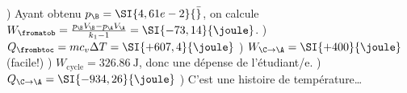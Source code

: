 \begin{description}
					) Ayant obtenu $p_\B = \SI{4,61e-2}{\bar}$, on calcule $W_\fromatob = \frac{p_\B V_\B - p_\A V_\A}{k_1 - 1} = \SI{-73,14}{\joule}$.
					) $Q_\frombtoc = m c_v \Delta T = \SI{+607,4}{\joule}$
					) $W_{\C \to \A} = \SI{+400}{\joule}$ (facile!)
					) $W_\text{cycle} = \SI{+326,86}{\joule}$, donc une dépense de l’étudiant/e.
					) $Q_{\C \to \A} = \SI{-934,26}{\joule}$
					) C’est une histoire de température\ldots
\end{description}

